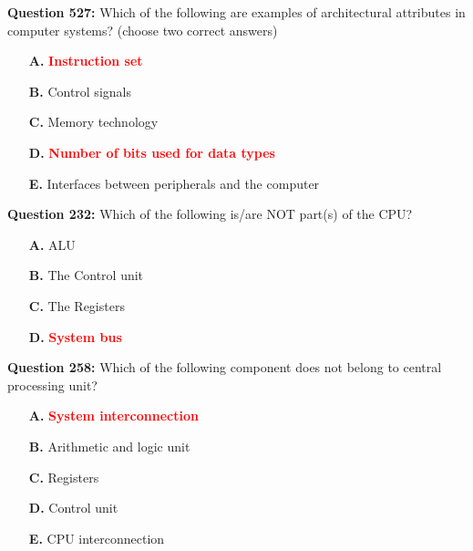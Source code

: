 \documentclass[12pt,a4paper]{article}
\begin{document}
\vspace{0.5cm}

\vspace{0.5cm}

\vspace{0.5cm}

\vspace{0.5cm}

\vspace{0.5cm}

\vspace{0.5cm}

\textbf{Question 527:} Which of the following are examples of architectural attributes in computer systems? (choose two correct answers)

\begin{itemize}
    \item[\textbf{A.}] \textcolor{red}{\textbf{Instruction set}}
    \item[\textbf{B.}] Control signals
    \item[\textbf{C.}] Memory technology
    \item[\textbf{D.}] \textcolor{red}{\textbf{Number of bits used for data types}}
    \item[\textbf{E.}] Interfaces between peripherals and the computer
\end{itemize}

\vspace{0.5cm}

\vspace{0.5cm}

\textbf{Question 232:} Which of the following is/are NOT part(s) of the CPU?

\begin{itemize}
    \item[\textbf{A.}] ALU
    \item[\textbf{B.}] The Control unit
    \item[\textbf{C.}] The Registers
    \item[\textbf{D.}] \textcolor{red}{\textbf{System bus}}
\end{itemize}

\vspace{0.5cm}

\vspace{0.5cm}

\textbf{Question 258:} Which of the following component does not belong to central processing unit?

\begin{itemize}
    \item[\textbf{A.}] \textcolor{red}{\textbf{System interconnection}}
    \item[\textbf{B.}] Arithmetic and logic unit
    \item[\textbf{C.}] Registers
    \item[\textbf{D.}] Control unit
    \item[\textbf{E.}] CPU interconnection
\end{itemize}
\end{document}
